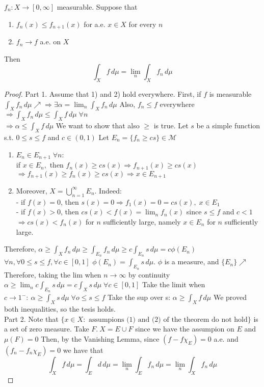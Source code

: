\begin{theorem}
    \(f_n:X\to \left[0, \infty\right]\) measurable. Suppose that 
    \begin{enumerate}
        \item \(f_n(x) \leq f_{n+1}(x)\) for a.e. \(x \in X\) for every \(n\)
        \item \(f_n \to f \) a.e. on \(X\)
    \end{enumerate} 
    Then \[ \int_X f \, d\mu = \lim_n \int_X f_n \, d\mu\]
\end{theorem}
\begin{proof}
    Part 1. Assume that 1) and 2) hold everywhere. First, if \(f\) is measurable \(\int_X f_n \, d\mu \nearrow \Rightarrow \exists \alpha = \lim_n \int_X f_n \, d\mu\)
    Also, \(f_n \leq f \) everywhere
    \(\Rightarrow \int_X f_n \, d\mu \leq \int_X f \, d\mu \; \forall n\) \\
    \(\Rightarrow \alpha \leq \int_X f \, d\mu \)
    We want to show that also \(\geq \) is true. Let \(s\) be a simple function s.t. \(0 \leq s \leq f\) and \(c \in \left(0,1\right)\)
    Let \(E_n = \{f_n \geq cs\} \in \mathcal{M}\)
    \begin{enumerate}
        \item \(E_n \in E_{n+1} \; \forall n:\) \\ if \(x \in E_n, \) then \(f_n(x) \geq cs(x) \Rightarrow f_{n+1}(x) \geq cs(x)\) \\ \(\Rightarrow f_{n+1}(x) \geq f_n(x) \geq cs(x) \Rightarrow x \in E_{n+1}\)
        \item Moreover, \(X = \bigcup_{n=1}^\infty E_n\). Indeed: \\ - if \(f(x)=0\), then \(s(x)=0 \Rightarrow f_1(x)=0 = cs(x), \; x \in E_1\) \\ - if \(f(x)>0\), then \(cs(x) < f(x)=\lim_n f_n(x)\) since \(s \leq f \) and \(c <1\) \\ \(\Rightarrow cs(x) < f_n(x)\) for \(n \) sufficiently large, namely \(x \in E_n \) for \(n \) sufficiently large. 
    \end{enumerate} 
    Therefore, \(\alpha \geq \int_X f_n \, d\mu \geq \int_{E_n} f_n \, d\mu \geq c \int_{E_n} s \, d\mu = c \phi(E_n)\)
    \(\forall n, \forall 0 \leq s \leq f, \forall c \in \left[0, 1\right]\)
    \(\phi(E_n) = \int_{E_n} s \, d\mu\). \(\phi\) is a measure, and \(\{E_n\} \nearrow\)
    Therefore, taking the lim when \(n \to \infty\) by continuity \(\alpha \geq \lim_n c \int_{E_n} s \, d\mu = c \int_X s \, d\mu \; \forall c \in \left[0, 1\right]\)
    Take the limit when \(c \to 1^-: \ \alpha \geq \int_X s \, d\mu \; \forall o \leq s \leq f \)
    Take the sup over s: \(\alpha \geq \int_X f \, d\mu \)
    We proved both inequalities, so the tesis holds. \\
    Part 2. Note that \(\{x \in X: \text{ assumpions (1) and (2) of the theorem do not hold}\}\) is a set of zero measure. Take \(F. \ X = E \cup F \) since we have the assumpion on \(E\) and \(\mu (F)=0\)
    Then, by the Vanishing Lemma, since \((f - f \chi_E)=0\) a.e. and \((f_n - f_n \chi_E)=0\) we have that \[ \int_X f \, d\mu = \int_E d \, d\mu = \lim_n \int_E f_n \, d\mu = \lim_n \int_X f_n \, d\mu \]


\end{proof}